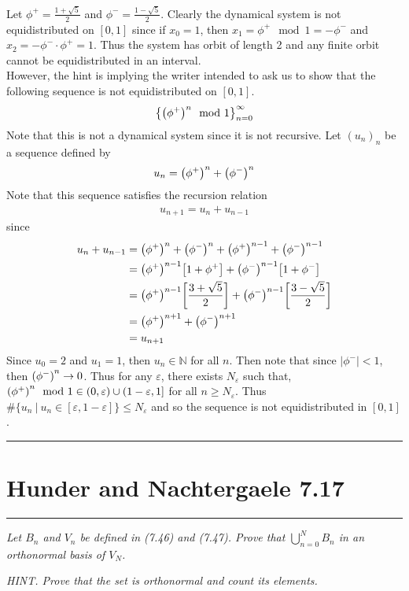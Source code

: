 \documentclass{article} %
\theoremstyle{plain}
\newcommand{\E}{\varepsilon}
\newcommand{\problem}[1]{
\vspace{.375cm}
\begin{minipage}{\textwidth}
    \begin{center}
        \noindent\rule{5cm}{1pt}
    \end{center}
    \section{\bf #1}
    \begin{center}
        \noindent\rule{5cm}{1pt}
    \end{center}
    \vspace{0.25cm}
\end{minipage}
}
\numberwithin{equation}{section} %
\numberwithin{figure}{section} %
\numberwithin{table}{section} %
\begin{document}
Let $\phi^+ = \frac{1 + \sqrt{5}}{2}$ and $\phi^- = \frac{1- \sqrt{5}}{2}$.  Clearly the dynamical system is not equidistributed on $[0,1]$ since if $x_0 = 1$, then $x_1 = \phi^+ \mod 1 = -\phi^-$ and $x_2 = -\phi^-\cdot \phi^+ = 1$.  Thus the system has orbit of length 2 and any finite orbit cannot be equidistributed in an interval. \\

However, the hint is implying the writer intended to ask us to show that the following sequence is not equidistributed on $[0,1]$.
\begin{align*}
    \left\{\qty(\phi^+)^n\mod 1\right\}_{n=0}^\infty
\end{align*}
Note that this is not a dynamical system since it is not recursive.  Let $(u_n)_n$ be a sequence defined by
\begin{align*}
    u_n = \qty(\phi^+)^n + \qty(\phi^-)^n
\end{align*}
Note that this sequence satisfies the recursion relation
\begin{align*}
    u_{n+1} = u_n + u_{n-1}
\end{align*}
since
\begin{align*}
    u_n + u_{n-1} &= \qty(\phi^+)^n + \qty(\phi^-)^n + \qty(\phi^+)^{n-1} + \qty(\phi^-)^{n-1} \\
    &= \qty(\phi^+)^{n-1}\qty[1 + \phi^+] + \qty(\phi^-)^{n-1}\qty[1 + \phi^-] \\
    &= \qty(\phi^+)^{n-1}\qty[\frac{3 + \sqrt{5}}{2}] + \qty(\phi^-)^{n-1}\qty[\frac{3 - \sqrt{5}}{2}] \\
    &= \qty(\phi^+)^{n+1} + \qty(\phi^-)^{n+1} \\
    &= u_{n+1}
\end{align*}
Since $u_0 = 2$ and $u_1 = 1$, then $u_n \in \mathbb{N}$ for all $n$.  Then note that since $\left|\phi^-\right| < 1$, then $\qty(\phi^-)^n \rightarrow 0$.  Thus for any $\E$, there exists $N_\E$ such that, $\qty(\phi^+)^n \mod 1 \in (0, \E) \cup (1 - \E, 1]$ for all $n \geq N_\E$.  Thus $\#\{u_n\ |\ u_n \in [\E, 1 - \E]\} \leq N_\E$ and so the sequence is not equidistributed in $[0,1]$.

\problem{Hunder and Nachtergaele 7.17}
\emph{Let $B_n$ and $V_n$ be defined in (7.46) and (7.47).  Prove that $\bigcup_{n=0}^N B_n$ in an orthonormal basis of $V_N$.}

\emph{HINT.  Prove that the set is orthonormal and count its elements.}
\end{document}
